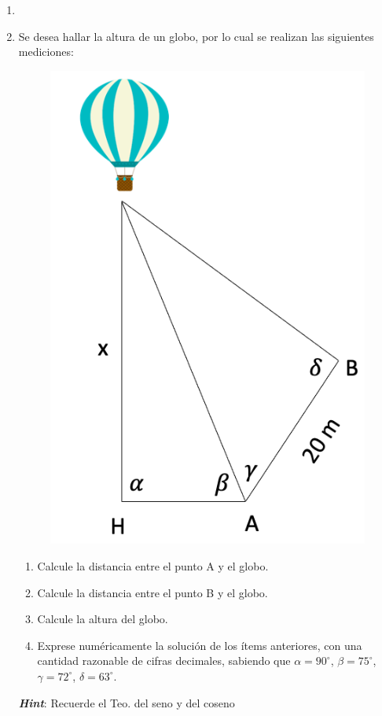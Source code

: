 \documentclass[letterpaper,11pt]{article}
\begin{document}
\vspace{-1cm}
\begin{enumerate}\setlength{\itemsep}{0.4cm}


\item[]

\item Se desea hallar la altura de un globo, por lo cual se realizan las siguientes mediciones:

\begin{figure}[H]
    \centering
    \includegraphics[width=0.3\linewidth]{2021-2/img/ejercicios/imagen_ej1.jpg}
\end{figure}

\begin{enumerate}
    \item Calcule la distancia entre el punto A y el globo.
    
    \item Calcule la distancia entre el punto B y el globo.
    
    \item Calcule la altura del globo.
    
    \item Exprese numéricamente la solución de los ítems anteriores, con una cantidad razonable de cifras decimales, sabiendo que $\alpha=90^{\circ}$, $\beta=75^{\circ}$, $\gamma=72^{\circ}$, $\delta=63^{\circ}$.  %
\end{enumerate}

\textbf{\textit{Hint}}: Recuerde el Teo. del seno y del coseno


%   

\end{enumerate}
\end{document}
